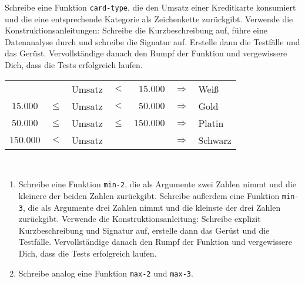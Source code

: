 \begin{aufgabe}
  Schreibe eine Funktion \texttt{card-type}, die den Umsatz einer
  Kreditkarte konsumiert und die eine entsprechende Kategorie als
  Zeichenkette zurückgibt.  Verwende die Konstruktionsanleitungen:
  Schreibe die Kurzbeschreibung auf, führe eine
  Datenanalyse durch und schreibe die Signatur auf. Erstelle
  dann die Testfälle und das Gerüst.  Vervollständige danach den
  Rumpf der Funktion und vergewissere Dich, dass die Tests
  erfolgreich laufen. \\

  \begin{tabular}{crlcrll}
    &        & Umsatz & $<$ & $15.000$   & $\Longrightarrow$ & Weiß \\
    $15.000$  & $\leq$ & Umsatz & $<$ & $50.000 $  & $\Longrightarrow$ & Gold \\
    $50.000$  & $\leq$ & Umsatz & $\leq$ & $150.000 $ 
    & $\Longrightarrow$ & Platin \\
    $150.000$ & $<$ & Umsatz &     &            &  $\Longrightarrow$ & Schwarz \\
  \end{tabular} \\
\end{aufgabe}

\begin{aufgabe}

  \begin{enumerate}

  \item Schreibe eine Funktion \texttt{min-2}, die als Argumente zwei
    Zahlen nimmt und die kleinere der beiden Zahlen zurückgibt.  Schreibe
    außerdem eine Funktion \texttt{min-3}, die als Argumente drei
    Zahlen nimmt und die kleinste der drei Zahlen zurückgibt.  Verwende
    die Konstruktionsanleitung: Schreibe
    explizit Kurzbeschreibung und Signatur auf, erstelle dann das
    Gerüst und die Testfälle.  Vervollständige danach den Rumpf der
    Funktion und vergewissere Dich, dass die Tests erfolgreich laufen.
    
  \item Schreibe analog eine Funktion \texttt{max-2} und \texttt{max-3}.
    
  \end{enumerate}
\end{aufgabe}

